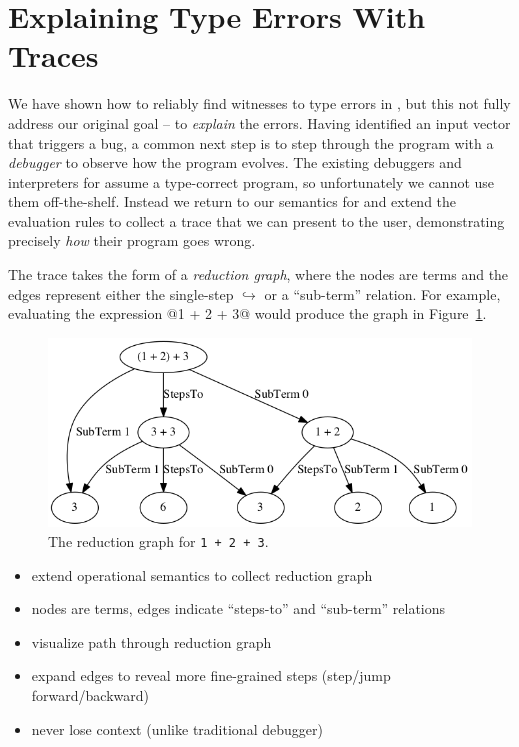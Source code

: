 \section{Explaining Type Errors With Traces}
\label{sec:explaining}
%
We have shown how to reliably find witnesses to type errors in \ocaml,
but this not fully address our original goal -- to \emph{explain} the
errors.
%
Having identified an input vector that triggers a bug, a common next
step is to step through the program with a \emph{debugger} to observe
how the program evolves.
%
The existing debuggers and interpreters for \ocaml assume a type-correct
program, so unfortunately we cannot use them off-the-shelf.
%
Instead we return to our semantics for \lang and extend the evaluation
rules to collect a trace that we can present to the user, demonstrating
precisely \emph{how} their program goes wrong.

The trace takes the form of a \emph{reduction graph}, where the nodes
are terms and the edges represent either the single-step
$\hookrightarrow$ or a ``sub-term'' relation. For example, evaluating
the expression @1 + 2 + 3@ would produce the graph in
Figure~\ref{fig:simple-reduction}.
%
\begin{figure}[t]
  \centering
  \includegraphics[width=\linewidth]{simple.png}
\caption{The reduction graph for \texttt{1 + 2 + 3}.}
\label{fig:simple-reduction}
\end{figure}

\begin{itemize}
\item extend operational semantics to collect reduction graph
\item nodes are terms, edges indicate ``steps-to'' and ``sub-term'' relations
\item visualize path through reduction graph
\item expand edges to reveal more fine-grained steps (step/jump forward/backward)
\item never lose context (unlike traditional debugger)
\end{itemize}
